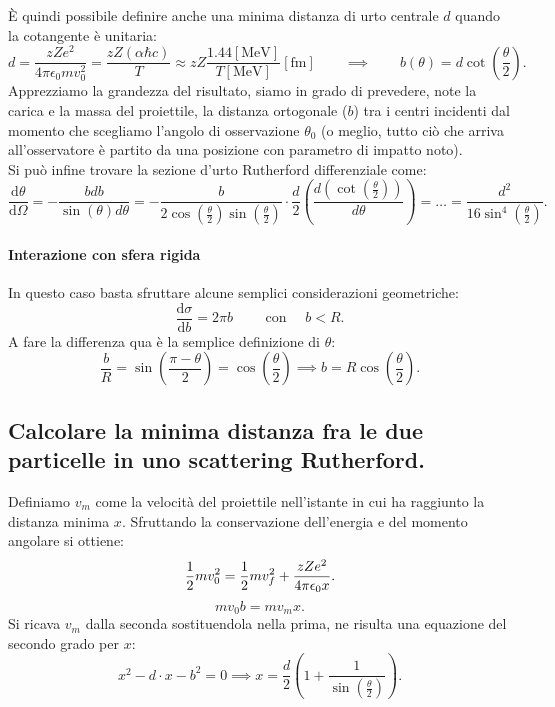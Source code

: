 È quindi possibile definire anche una minima distanza di urto centrale $d$ quando la cotangente è unitaria:
\[
	d = \frac{zZe^2}{4 \pi \epsilon_0 m  v_0^2} = \frac{zZ\left( \alpha \hbar c \right)}{T} \approx zZ \frac{1.44[\text{MeV}]}{T[\text{MeV}]} [\text{fm}]
	\quad \quad \implies \quad \quad b\left( \theta \right) = d \cot\left( \frac{\theta}{2} \right) 
.\] \label{eq:d-rutherford}
Apprezziamo la grandezza del risultato, siamo in grado di prevedere, note la carica e la massa del proiettile, la distanza ortogonale ($b$) tra i centri incidenti dal momento che scegliamo l'angolo di osservazione $\theta_0$ (o meglio, tutto ciò che arriva all'osservatore è partito da una posizione con parametro di impatto noto).\\
Si può infine trovare la sezione d'urto Rutherford differenziale come:
\[
	\frac{\mbox{d} \theta}{\mbox{d} \Omega} = -\frac{b db}{\sin\left( \theta \right) d \theta} =
	-\frac{b}{2 \cos\left( \frac{\theta}{2} \right) \sin\left( \frac{\theta}{2} \right)} \cdot \frac{d}{2}\left( \frac{d \left( \cot\left( \frac{\theta}{2} \right)\right)}{d \theta} \right) = 
	\ldots = \frac{d^2}{16 \sin^{4}\left( \frac{\theta}{2} \right) } 
.\] 

\paragraph{Interazione con sfera rigida}
In questo caso basta sfruttare alcune semplici considerazioni geometriche:
\[
	\frac{\text{d}\sigma}{\text{d} b} = 2 \pi b \quad \quad \text{ con } \quad b<R 
.\] 
A fare la differenza qua è la semplice definizione di $\theta$:
\[
	\frac{b}{R} = \sin\left( \frac{\pi - \theta}{2} \right) = \cos\left( \frac{\theta}{2} \right)  \implies b = R \cos\left( \frac{\theta}{2} \right) 
.\] 

\subsection[\hspace{2mm} ]{Calcolare la minima distanza fra le due particelle in uno scattering Rutherford.}
Definiamo $v_m$ come la velocità del proiettile nell'istante in cui ha raggiunto la distanza minima $x$. Sfruttando la conservazione dell'energia e del momento angolare si ottiene:
\[	
	\frac{1}{2}m v_0^2 = \frac{1}{2} m v_f^2 + \frac{zZe^2}{4 \pi \epsilon_0 x}\\
.\] 
\[
	mv_0b = m v_m x
.\]
Si ricava $v_m$ dalla seconda sostituendola nella prima, ne risulta una equazione del secondo grado per $x$:
 \[
	 x^2 - d \cdot x - b^2 = 0 \implies x = \frac{d}{2} \left( 1 + \frac{1}{\sin\left( \frac{\theta}{2} \right) } \right) 
.\] 
